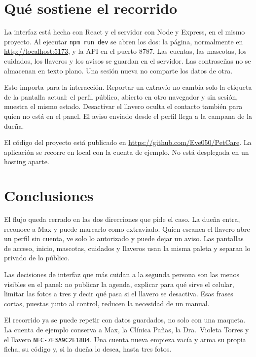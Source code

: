 \documentclass[12pt,a4paper]{article}
\begin{document}
\section{Qué sostiene el recorrido}

La interfaz está hecha con React y el servidor con Node y Express, en el mismo proyecto. Al ejecutar \texttt{npm run dev} se abren los dos: la página, normalmente en \url{http://localhost:5173}, y la API en el puerto 8787. Las cuentas, las mascotas, los cuidados, los llaveros y los avisos se guardan en el servidor. Las contraseñas no se almacenan en texto plano. Una sesión nueva no comparte los datos de otra.

Esto importa para la interacción. Reportar un extravío no cambia solo la etiqueta de la pantalla actual: el perfil público, abierto en otro navegador y sin sesión, muestra el mismo estado. Desactivar el llavero oculta el contacto también para quien no está en el panel. El aviso enviado desde el perfil llega a la campana de la dueña.

El código del proyecto está publicado en \url{https://github.com/Eve050/PetCare}. La aplicación se recorre en local con la cuenta de ejemplo. No está desplegada en un hosting aparte.

\section{Conclusiones}

El flujo queda cerrado en las dos direcciones que pide el caso. La dueña entra, reconoce a Max y puede marcarlo como extraviado. Quien escanea el llavero abre un perfil sin cuenta, ve solo lo autorizado y puede dejar un aviso. Las pantallas de acceso, inicio, mascotas, cuidados y llaveros usan la misma paleta y separan lo privado de lo público.

Las decisiones de interfaz que más cuidan a la segunda persona son las menos visibles en el panel: no publicar la agenda, explicar para qué sirve el celular, limitar las fotos a tres y decir qué pasa si el llavero se desactiva. Esas frases cortas, puestas junto al control, reducen la necesidad de un manual.

El recorrido ya se puede repetir con datos guardados, no solo con una maqueta. La cuenta de ejemplo conserva a Max, la Clínica Pañas, la Dra.~Violeta Torres y el llavero \texttt{NFC-7F3A9C2E18B4}. Una cuenta nueva empieza vacía y arma su propia ficha, su código y, si la dueña lo desea, hasta tres fotos.
\end{document}
